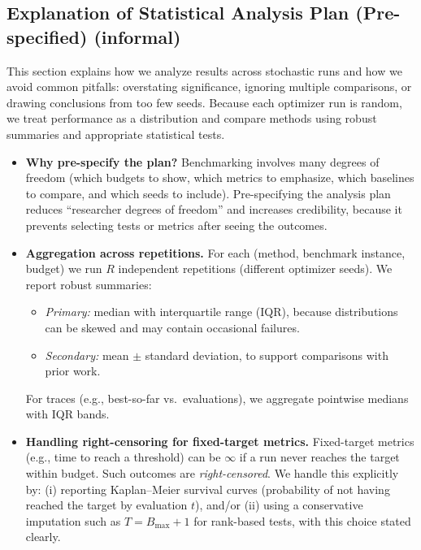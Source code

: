 \subsection*{Explanation of Statistical Analysis Plan (Pre-specified) (informal)}
This section explains how we analyze results across stochastic runs and how we avoid common pitfalls:
overstating significance, ignoring multiple comparisons, or drawing conclusions from too few seeds.
Because each optimizer run is random, we treat performance as a distribution and compare methods using robust summaries
and appropriate statistical tests.

\begin{itemize}
    \item \textbf{Why pre-specify the plan?}
    Benchmarking involves many degrees of freedom (which budgets to show, which metrics to emphasize, which baselines to compare,
    and which seeds to include). Pre-specifying the analysis plan reduces ``researcher degrees of freedom'' and increases credibility,
    because it prevents selecting tests or metrics after seeing the outcomes.

    \item \textbf{Aggregation across repetitions.}
    For each (method, benchmark instance, budget) we run \(R\) independent repetitions (different optimizer seeds).
    We report robust summaries:
    \begin{itemize}
        \item \emph{Primary:} median with interquartile range (IQR), because distributions can be skewed and may contain occasional failures.
        \item \emph{Secondary:} mean \(\pm\) standard deviation, to support comparisons with prior work.
    \end{itemize}
    For traces (e.g., best-so-far vs.\ evaluations), we aggregate pointwise medians with IQR bands.

    \item \textbf{Handling right-censoring for fixed-target metrics.}
    Fixed-target metrics (e.g., time to reach a threshold) can be \(\infty\) if a run never reaches the target within budget.
    Such outcomes are \emph{right-censored}.
    We handle this explicitly by:
    (i) reporting Kaplan--Meier survival curves (probability of not having reached the target by evaluation \(t\)),
    and/or (ii) using a conservative imputation such as \(T = B_{\max}+1\) for rank-based tests, with this choice stated clearly.


\end{itemize}
